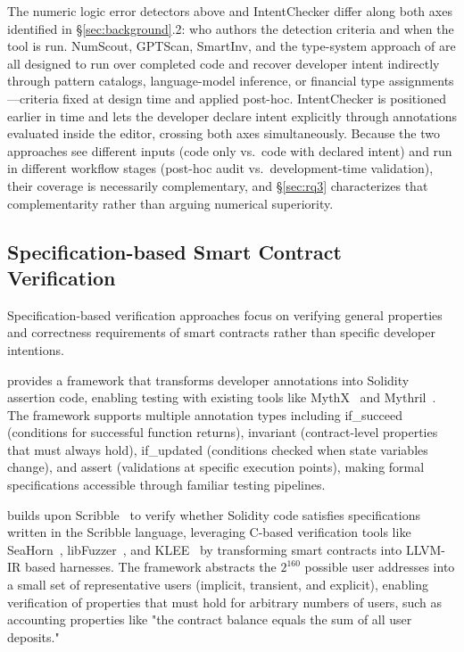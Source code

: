 \documentclass[pdflatex,sn-basic]{sn-jnl}%
\theoremstyle{thmstyleone}%
\theoremstyle{thmstyletwo}%
\theoremstyle{thmstylethree}%
\begin{document}
The numeric logic error detectors above and IntentChecker differ along both axes identified in §\ref{sec:background}.2: who authors the detection criteria and when the tool is run.
NumScout, GPTScan, SmartInv, and the type-system approach of \citet{sctype} are all designed to run over completed code and recover developer intent indirectly through pattern catalogs, language-model inference, or financial type assignments---criteria fixed at design time and applied post-hoc.
IntentChecker is positioned earlier in time and lets the developer declare intent explicitly through annotations evaluated inside the editor, crossing both axes simultaneously.
Because the two approaches see different inputs (code only vs.\ code with declared intent) and run in different workflow stages (post-hoc audit vs.\ development-time validation), their coverage is necessarily complementary, and §\ref{sec:rq3} characterizes that complementarity rather than arguing numerical superiority.

\subsection{Specification-based Smart Contract Verification}
Specification-based verification approaches focus on verifying general properties and correctness requirements of smart contracts rather than specific developer intentions.

\citep{scribble} provides a framework that transforms developer annotations into Solidity assertion code,
enabling testing with existing tools like MythX~\citep{mythx} and Mythril~\citep{mythril}.
The framework supports multiple annotation types including if\_succeed (conditions for successful function returns),
invariant (contract-level properties that must always hold), if\_updated (conditions checked when state variables change),
and assert (validations at specific execution points), making formal specifications accessible through familiar testing pipelines.

\citep{smartace} builds upon Scribble~\citep{scribble} to verify whether Solidity code satisfies specifications written in the Scribble language,
leveraging C-based verification tools like SeaHorn~\citep{seahorn}, libFuzzer~\citep{libfuzzer}, and KLEE~\citep{klee} by transforming smart contracts into LLVM-IR based harnesses.
The framework abstracts the $2^{160}$ possible user addresses into a small set of representative users (implicit, transient, and explicit),
enabling verification of properties that must hold for arbitrary numbers of users, such as accounting properties like
"the contract balance equals the sum of all user deposits."
\end{document}
